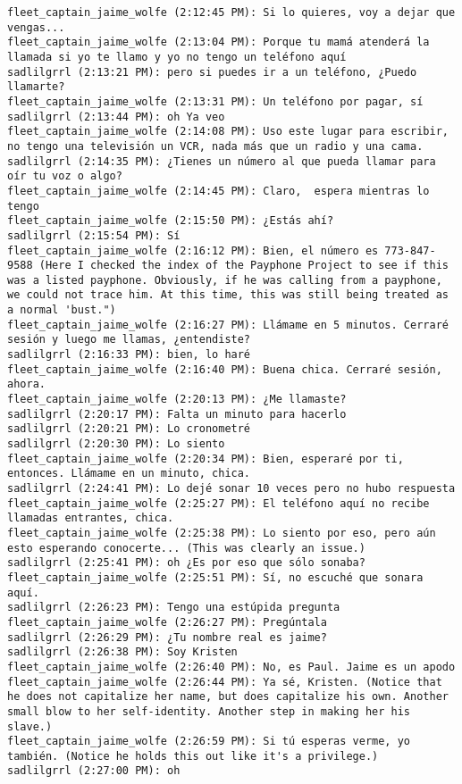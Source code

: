 \begin{verbatim}
fleet_captain_jaime_wolfe (2:12:45 PM): Si lo quieres, voy a dejar que vengas...
fleet_captain_jaime_wolfe (2:13:04 PM): Porque tu mamá atenderá la llamada si yo te llamo y yo no tengo un teléfono aquí
sadlilgrrl (2:13:21 PM): pero si puedes ir a un teléfono, ¿Puedo llamarte?
fleet_captain_jaime_wolfe (2:13:31 PM): Un teléfono por pagar, sí
sadlilgrrl (2:13:44 PM): oh Ya veo
fleet_captain_jaime_wolfe (2:14:08 PM): Uso este lugar para escribir, no tengo una televisión un VCR, nada más que un radio y una cama.
sadlilgrrl (2:14:35 PM): ¿Tienes un número al que pueda llamar para oír tu voz o algo?
fleet_captain_jaime_wolfe (2:14:45 PM): Claro,  espera mientras lo tengo
fleet_captain_jaime_wolfe (2:15:50 PM): ¿Estás ahí?
sadlilgrrl (2:15:54 PM): Sí
fleet_captain_jaime_wolfe (2:16:12 PM): Bien, el número es 773-847-9588 (Here I checked the index of the Payphone Project to see if this was a listed payphone. Obviously, if he was calling from a payphone, we could not trace him. At this time, this was still being treated as a normal 'bust.")
fleet_captain_jaime_wolfe (2:16:27 PM): Llámame en 5 minutos. Cerraré sesión y luego me llamas, ¿entendiste?
sadlilgrrl (2:16:33 PM): bien, lo haré
fleet_captain_jaime_wolfe (2:16:40 PM): Buena chica. Cerraré sesión, ahora.
fleet_captain_jaime_wolfe (2:20:13 PM): ¿Me llamaste?
sadlilgrrl (2:20:17 PM): Falta un minuto para hacerlo
sadlilgrrl (2:20:21 PM): Lo cronometré
sadlilgrrl (2:20:30 PM): Lo siento
fleet_captain_jaime_wolfe (2:20:34 PM): Bien, esperaré por ti, entonces. Llámame en un minuto, chica.
sadlilgrrl (2:24:41 PM): Lo dejé sonar 10 veces pero no hubo respuesta
fleet_captain_jaime_wolfe (2:25:27 PM): El teléfono aquí no recibe llamadas entrantes, chica.
fleet_captain_jaime_wolfe (2:25:38 PM): Lo siento por eso, pero aún esto esperando conocerte... (This was clearly an issue.)
sadlilgrrl (2:25:41 PM): oh ¿Es por eso que sólo sonaba?
fleet_captain_jaime_wolfe (2:25:51 PM): Sí, no escuché que sonara aquí.
sadlilgrrl (2:26:23 PM): Tengo una estúpida pregunta
fleet_captain_jaime_wolfe (2:26:27 PM): Pregúntala 
sadlilgrrl (2:26:29 PM): ¿Tu nombre real es jaime?
sadlilgrrl (2:26:38 PM): Soy Kristen
fleet_captain_jaime_wolfe (2:26:40 PM): No, es Paul. Jaime es un apodo
fleet_captain_jaime_wolfe (2:26:44 PM): Ya sé, Kristen. (Notice that he does not capitalize her name, but does capitalize his own. Another small blow to her self-identity. Another step in making her his slave.)
fleet_captain_jaime_wolfe (2:26:59 PM): Si tú esperas verme, yo también. (Notice he holds this out like it's a privilege.)
sadlilgrrl (2:27:00 PM): oh

\end{verbatim}

